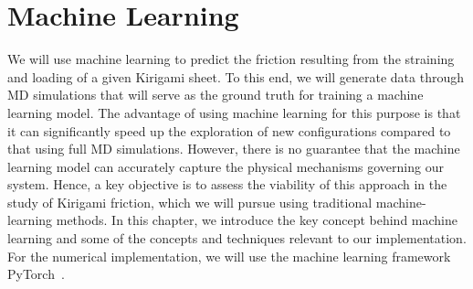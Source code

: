 \chapter{Machine Learning}\label{chap:ML}
We will use machine learning to predict the friction resulting from the straining and loading of a given Kirigami sheet. To this end, we will generate data through \acrshort{MD} simulations that will serve as the ground truth for training a machine learning model. The advantage of using machine learning for this purpose is that it can significantly speed up the exploration of new configurations compared to that using full \acrshort{MD} simulations. However, there is no guarantee that the machine learning model can accurately capture the physical mechanisms governing our system. Hence, a key objective is to assess
the viability of this approach in the study of Kirigami friction, which we will pursue using traditional machine-learning methods. In this
chapter, we introduce the key concept behind machine learning and some of the concepts and techniques relevant to our implementation. For the numerical implementation, we will use the machine learning framework PyTorch~\cite{NEURIPS2019_9015}.


